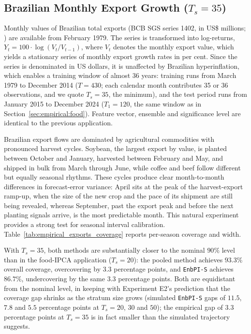 \subsection{Brazilian Monthly Export Growth (\texorpdfstring{$T_s = 35$}{Ts = 35})}
\label{sec:empirical:exports}

Monthly values of Brazilian total exports (BCB SGS series 1402, in
US\$ millions; \citealp{bcb2024sgs}) are available from February
1979.  The series is transformed into log-returns,
$Y_t = 100 \cdot \log(V_t / V_{t-1})$, where $V_t$ denotes the
monthly export value, which yields a stationary series of monthly
export growth rates in per cent.  Since the series is denominated in
US dollars, it is unaffected by Brazilian hyperinflation, which
enables a training window of almost 36 years: training runs from
March 1979 to December 2014 ($T = 430$; each calendar month
contributes 35 or 36 observations, and we quote $T_s = 35$, the
minimum), and the test period runs from January 2015 to December 2024
($T_1 = 120$, the same window as in
Section~\ref{sec:empirical:food}).  Feature vector, ensemble and
significance level are identical to the previous application.

Brazilian export flows are dominated by agricultural commodities with
pronounced harvest cycles.  Soybean, the largest export by value, is
planted between October and January, harvested between February and
May, and shipped in bulk from March through June, while coffee and
beef follow different but equally seasonal rhythms.  These cycles
produce clear month-to-month differences in forecast-error variance:
April sits at the peak of the harvest-export ramp-up, when the size
of the new crop and the pace of its shipment are still being
revealed, whereas September, past the export peak and before the next
planting signals arrive, is the most predictable month.  This natural
experiment provides a strong test for seasonal interval calibration.
Table~\ref{tab:empirical_exports_coverage} reports per-season
coverage and width.



With $T_s = 35$, both methods are substantially closer to the nominal
$90\%$ level than in the food-IPCA application ($T_s = 20$): the
pooled method achieves $93.3\%$ overall coverage, overcovering by
$3.3$ percentage points, and \texttt{EnbPI-S} achieves $86.7\%$,
undercovering by the same $3.3$ percentage points.  Both are
equidistant from the nominal level, in keeping with Experiment E2's
prediction that the coverage gap shrinks as the stratum size grows
(simulated \texttt{EnbPI-S} gaps of $11.5$, $7.8$ and $5.5$
percentage points at $T_s = 20$, $30$ and $50$); the empirical gap of
$3.3$ percentage points at $T_s = 35$ is in fact smaller than the
simulated trajectory suggests.

